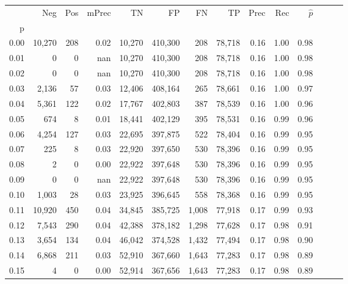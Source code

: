 \begin{tabular}{rrrrrrrrrrrrrr}
\toprule
{} &     Neg &    Pos & mPrec &       TN &       FP &      FN &      TP &  Prec &   Rec & $\hat{p}$ \\
p    &         &        &       &          &          &         &         &       &       &           \\
\midrule
0.00 &  10,270 &    208 &  0.02 &   10,270 &  410,300 &     208 &  78,718 &  0.16 &  1.00 &      0.98 \\
0.01 &       0 &      0 &   nan &   10,270 &  410,300 &     208 &  78,718 &  0.16 &  1.00 &      0.98 \\
0.02 &       0 &      0 &   nan &   10,270 &  410,300 &     208 &  78,718 &  0.16 &  1.00 &      0.98 \\
0.03 &   2,136 &     57 &  0.03 &   12,406 &  408,164 &     265 &  78,661 &  0.16 &  1.00 &      0.97 \\
0.04 &   5,361 &    122 &  0.02 &   17,767 &  402,803 &     387 &  78,539 &  0.16 &  1.00 &      0.96 \\
0.05 &     674 &      8 &  0.01 &   18,441 &  402,129 &     395 &  78,531 &  0.16 &  0.99 &      0.96 \\
0.06 &   4,254 &    127 &  0.03 &   22,695 &  397,875 &     522 &  78,404 &  0.16 &  0.99 &      0.95 \\
0.07 &     225 &      8 &  0.03 &   22,920 &  397,650 &     530 &  78,396 &  0.16 &  0.99 &      0.95 \\
0.08 &       2 &      0 &  0.00 &   22,922 &  397,648 &     530 &  78,396 &  0.16 &  0.99 &      0.95 \\
0.09 &       0 &      0 &   nan &   22,922 &  397,648 &     530 &  78,396 &  0.16 &  0.99 &      0.95 \\
0.10 &   1,003 &     28 &  0.03 &   23,925 &  396,645 &     558 &  78,368 &  0.16 &  0.99 &      0.95 \\
0.11 &  10,920 &    450 &  0.04 &   34,845 &  385,725 &   1,008 &  77,918 &  0.17 &  0.99 &      0.93 \\
0.12 &   7,543 &    290 &  0.04 &   42,388 &  378,182 &   1,298 &  77,628 &  0.17 &  0.98 &      0.91 \\
0.13 &   3,654 &    134 &  0.04 &   46,042 &  374,528 &   1,432 &  77,494 &  0.17 &  0.98 &      0.90 \\
0.14 &   6,868 &    211 &  0.03 &   52,910 &  367,660 &   1,643 &  77,283 &  0.17 &  0.98 &      0.89 \\
0.15 &       4 &      0 &  0.00 &   52,914 &  367,656 &   1,643 &  77,283 &  0.17 &  0.98 &      0.89 \\

\end{tabular}
